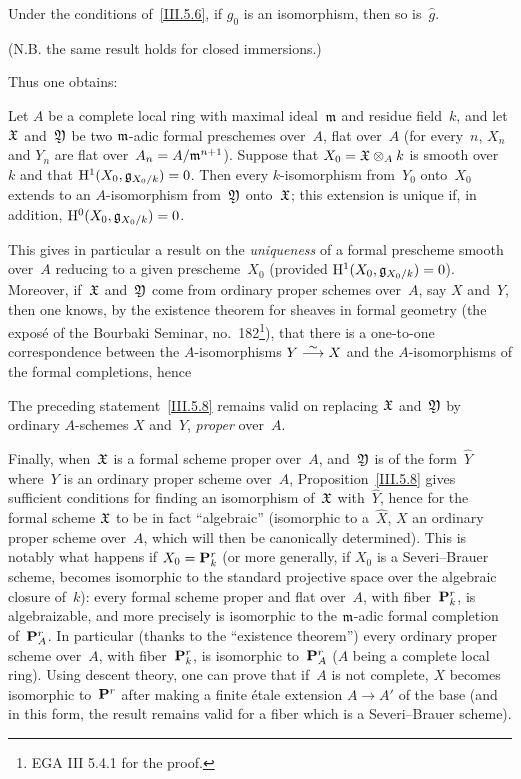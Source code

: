 \begin{corollary}
\label{III.5.7}
Under the conditions of~\ref{III.5.6}, if $g_0$ is an isomorphism, then so
is~$\widehat{g}$.
\end{corollary}

\noindent
(N.B. the same result holds for closed immersions.)

Thus one obtains:

\begin{proposition}
\label{III.5.8}
Let $A$ be a complete local ring with maximal ideal~$\mathfrak{m}$ and residue
field~$k$, and let $\mathfrak{X}$ and~$\mathfrak{Y}$ be two $\mathfrak{m}$-adic formal
preschemes over~$A$, flat over~$A$ (\ie for every~$n$, $X_n$ and $Y_n$ are
flat over~$A_n=A/\mathfrak{m}^{n+1}$). Suppose that
$X_0=\mathfrak{X}\otimes_A k$ is smooth over~$k$ and that
$\mathrm{H}^1(X_0,\mathfrak{g}_{X_0/k})=0$. Then every $k$-isomorphism from~$Y_0$ onto~$X_0$
extends to an $A$-isomorphism from~$\mathfrak{Y}$ onto~$\mathfrak{X}$; this extension
is unique if, in addition, $\mathrm{H}^0(X_0,\mathfrak{g}_{X_0/k})=0$.
\end{proposition}

This gives in particular a result on the \emph{uniqueness} of a formal
prescheme smooth over~$A$ reducing to a given prescheme~$X_0$ (provided
$\mathrm{H}^1(X_0,\mathfrak{g}_{X_0/k})=0$). Moreover, if~$\mathfrak{X}$ and~$\mathfrak{Y}$
come from ordinary proper schemes over~$A$, say $X$ and~$Y$, then one knows,
by the existence theorem for sheaves in formal geometry (\cf the exposé
of the Bourbaki Seminar, no.~182\footnote{\Cf EGA III 5.4.1 for the proof.}),
that there is a one-to-one correspondence between the $A$-isomorphisms
$Y\overset{\sim}{\longrightarrow} X$ and the $A$-isomorphisms of the formal completions, hence

\begin{corollary}
\label{III.5.9}
The preceding statement~\ref{III.5.8} remains valid on replacing
$\mathfrak{X}$ and~$\mathfrak{Y}$ by ordinary $A$-schemes $X$ and~$Y$, \emph{proper}
over~$A$.
\end{corollary}

Finally, when~$\mathfrak{X}$ is a formal scheme proper over~$A$, and~$\mathfrak{Y}$
is of the form~$\widehat{Y}$ where~$Y$ is an ordinary proper scheme over~$A$,
Proposition~\ref{III.5.8} gives sufficient conditions for finding an
isomorphism of~$\mathfrak{X}$ with~$\widehat{Y}$, hence for the formal scheme
$\mathfrak{X}$ to be in fact ``algebraic'' (\ie isomorphic to a~$\widehat{X}$,
$X$ an ordinary proper scheme over~$A$, which will then be canonically
determined). This is notably what happens if $X_0=\mathbf{P}_k^r$ (or more
generally, if $X_0$ is a Severi--Brauer scheme, \ie becomes isomorphic to
the standard projective space over the algebraic closure of~$k$): every
formal scheme proper and flat over~$A$, with fiber~$\mathbf{P}_k^r$, is
algebraizable, and more precisely is isomorphic to the $\mathfrak{m}$-adic
formal completion of~$\mathbf{P}_A^r$. In particular (thanks to the ``existence
theorem'') every ordinary proper scheme over~$A$, with fiber~$\mathbf{P}_k^r$,
is isomorphic to~$\mathbf{P}_A^r$ ($A$ being a complete local ring). Using
descent theory, one can prove that if~$A$ is not complete, $X$ becomes
isomorphic to~$\mathbf{P}^r$ after making a finite étale extension
$A\to A'$ of the base (and in this form, the result remains valid for a
fiber which is a Severi--Brauer scheme).
